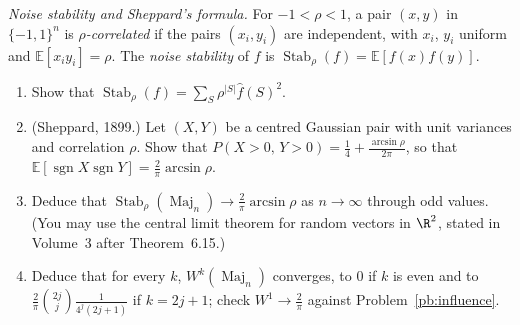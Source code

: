 \begin{exercise}[$\star\star\star$]\label{pb:majoritystable}
\emph{Noise stability and Sheppard's formula.} For $-1<\rho<1$, a pair $(x,y)$ in $\{-1,1\}^n$ is \emph{$\rho$-correlated} if the pairs
$(x_i,y_i)$ are independent, with $x_i$, $y_i$ uniform and $\mathbb E[x_iy_i]=\rho$. The \emph{noise stability} of $f$ is
$\operatorname{Stab}_\rho(f)=\mathbb E[f(x)f(y)]$.
\begin{enumerate}[label=(\alph*)]
\item Show that $\operatorname{Stab}_\rho(f)=\sum_S\rho^{|S|}\hat f(S)^2$.
\item (Sheppard, 1899.) Let $(X,Y)$ be a centred Gaussian pair with unit variances and correlation $\rho$. Show that
$P(X>0,\,Y>0)=\frac14+\frac{\arcsin\rho}{2\pi}$, so that $\mathbb E[\operatorname{sgn}X\operatorname{sgn}Y]=\frac2\pi\arcsin\rho$.
\item Deduce that $\operatorname{Stab}_\rho(\operatorname{Maj}_n)\to\frac2\pi\arcsin\rho$ as $n\to\infty$ through odd values. (You may use the central limit theorem for
random vectors in $\R^2$, stated in Volume~3 after Theorem~6.15.)
\item Deduce that for every $k$, $W^k(\operatorname{Maj}_n)$ converges, to $0$ if $k$ is even and to $\frac2\pi\binom{2j}j\frac1{4^j(2j+1)}$ if $k=2j+1$; check
$W^1\to\frac2\pi$ against Problem~\ref{pb:influence}.
\end{enumerate}
\end{exercise}

